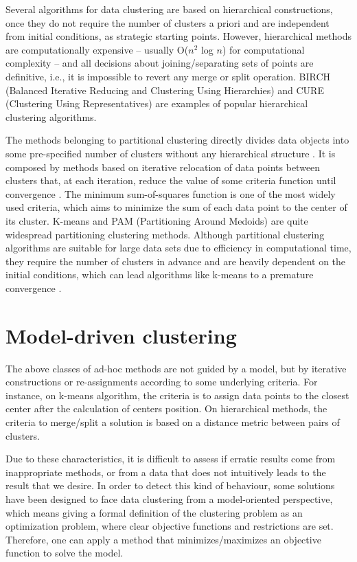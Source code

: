 Several algorithms for data clustering are based on hierarchical constructions, once they do not require the number of clusters a priori and are independent from initial conditions, as strategic starting points. However, hierarchical methods are computationally expensive -- usually O($n^2$ log $n$) for computational complexity -- and all decisions about joining/separating sets of points are definitive, i.e., it is impossible to revert any merge or split operation. BIRCH (Balanced Iterative Reducing and Clustering Using Hierarchies) \cite{Zhang96} and CURE (Clustering Using Representatives) \cite{Guha1998} are examples of popular hierarchical clustering algorithms.
 
The methods belonging to partitional clustering directly divides data objects into some pre-specified number of clusters without any hierarchical structure \cite{Xu2005}. It is composed by methods based on iterative relocation of data points between clusters that, at each iteration, reduce the value of some criteria function until convergence \cite{Karkkainen2006}. The minimum sum-of-squares function is one of the most widely used criteria, which aims to minimize the sum of each data point to the center of its cluster. K-means and PAM (Partitioning Around Medoids) are quite widespread partitioning clustering methods. Although partitional clustering algorithms are suitable for large data sets due to efficiency in computational time, they require the number of clusters in advance and are heavily dependent on the initial conditions, which can lead algorithms like k-means to a premature convergence \cite{Das2009}.

\section{Model-driven clustering}
The above classes of ad-hoc methods are not guided by a model, but by iterative constructions or re-assignments according to some underlying criteria. For instance, on k-means algorithm, the criteria is to assign data points to the closest center after the calculation of centers position. On hierarchical methods, the criteria to merge/split a solution is based on a distance metric between pairs of clusters.

Due to these characteristics, it is difficult to assess if erratic results come from inappropriate methods, or from a data that does not intuitively leads to the result that we desire. In order to detect this kind of behaviour, some solutions have been designed to face data clustering from a model-oriented perspective, which means giving a formal definition of the clustering problem as an optimization problem, where clear objective functions and restrictions are set. Therefore, one can apply a method that minimizes/maximizes an objective function to solve the model.

